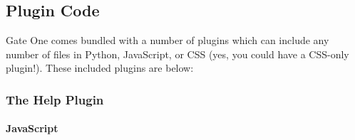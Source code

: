 \documentclass[letterpaper,10pt,openany]{sphinxmanual}
\begin{document}
\subsection{Plugin Code}
\label{Developer/index:plugin-code}
Gate One comes bundled with a number of plugins which can include any number of files in Python, JavaScript, or CSS (yes, you could have a CSS-only plugin!).  These included plugins are below:


\subsubsection{The Help Plugin}
\label{Developer/plugin_help::doc}\label{Developer/plugin_help:the-help-plugin}

\paragraph{JavaScript}
\label{Developer/plugin_help:javascript}
\end{document}
